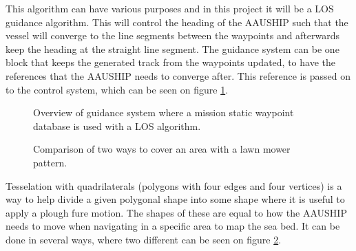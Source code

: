 This algorithm can have various purposes and in this project it will be a \ac{LOS} guidance algorithm. This will control the heading of the AAUSHIP such that the vessel will converge to the line segments between the waypoints and afterwards keep the heading at the straight line segment. The guidance system can be one block that keeps the generated track from the waypoints updated, to have the references that the AAUSHIP needs to converge after. This reference is passed on to the control system, which can be seen on figure \ref{fig:losguide}.
\begin{figure}[htbp]
	\centering
	
	\caption{Overview of guidance system where a mission static waypoint
	database is used with a \ac{LOS} algorithm.}
	\label{fig:losguide}
\end{figure}


\begin{figure}[htbp]
	\centering
	
	\caption{Comparison of two ways to cover an area with a lawn mower
	pattern.}
    \label{fig:use-case-polygon}
\end{figure}

Tesselation with quadrilaterals (polygons with four edges and four vertices) is a way to help divide a given polygonal shape into some shape where it is useful to apply a plough fure motion. The shapes of these are equal to how the AAUSHIP needs to move when navigating in a specific area to map the sea bed. It can be done in several ways, where two different can be seen on figure \ref{fig:use-case-polygon}.
